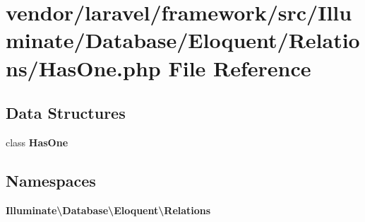 \section{vendor/laravel/framework/src/\+Illuminate/\+Database/\+Eloquent/\+Relations/\+Has\+One.php File Reference}
\label{_has_one_8php}
\subsection*{Data Structures}
\begin{DoxyCompactItemize}
\item 
class {\bf Has\+One}
\end{DoxyCompactItemize}
\subsection*{Namespaces}
\begin{DoxyCompactItemize}
\item 
 {\bf Illuminate\textbackslash{}\+Database\textbackslash{}\+Eloquent\textbackslash{}\+Relations}
\end{DoxyCompactItemize}

